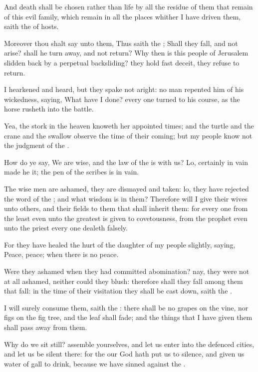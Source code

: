 \verse And death shall be chosen rather than life by all the residue of them that remain of this evil family, which remain in all the places whither I have driven them, saith the \LORD of hosts.

\verse Moreover thou shalt say unto them, Thus saith the \LORD; Shall they fall, and not arise? shall he turn away, and not return?  \verse Why then is this people of Jerusalem slidden back by a perpetual backsliding?  they hold fast deceit, they refuse to return.

\verse I hearkened and heard, but they spake not aright: no man repented him of his wickedness, saying, What have I done? every one turned to his course, as the horse rusheth into the battle.

\verse Yea, the stork in the heaven knoweth her appointed times; and the turtle and the crane and the swallow observe the time of their coming; but my people know not the judgment of the \LORD.

\verse How do ye say, We are wise, and the law of the \LORD is with us?  Lo, certainly in vain made he it; the pen of the scribes is in vain.

\verse The wise men are ashamed, they are dismayed and taken: lo, they have rejected the word of the \LORD; and what wisdom is in them?  \verse Therefore will I give their wives unto others, and their fields to them that shall inherit them: for every one from the least even unto the greatest is given to covetousness, from the prophet even unto the priest every one dealeth falsely.

\verse For they have healed the hurt of the daughter of my people slightly, saying, Peace, peace; when there is no peace.

\verse Were they ashamed when they had committed abomination? nay, they were not at all ashamed, neither could they blush: therefore shall they fall among them that fall: in the time of their visitation they shall be cast down, saith the \LORD.

\verse I will surely consume them, saith the \LORD: there shall be no grapes on the vine, nor figs on the fig tree, and the leaf shall fade; and the things that I have given them shall pass away from them.

\verse Why do we sit still? assemble yourselves, and let us enter into the defenced cities, and let us be silent there: for the \LORD our God hath put us to silence, and given us water of gall to drink, because we have sinned against the \LORD.

